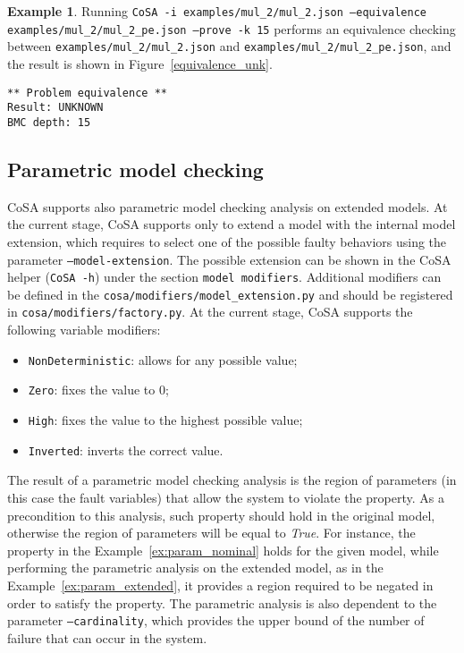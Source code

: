 \documentclass{article}
\theoremstyle{definition}
\newtheorem{example}{Example}[section]
\begin{document}
\begin{example}
  Running \texttt{CoSA -i examples/mul\_2/mul\_2.json --equivalence
    examples/mul\_2/mul\_2\_pe.json --prove -k 15} performs an
  equivalence checking between \texttt{examples/mul\_2/mul\_2.json}
  and \texttt{examples/mul\_2/mul\_2\_pe.json}, and the result is
  shown in Figure~\ref{equivalence_unk}.

\begin{lstlisting}[frame=single,language=ets,caption=Equivalence example (UNKNOWN),label=equivalence_unk]
** Problem equivalence **
Result: UNKNOWN
BMC depth: 15
\end{lstlisting}

\end{example}

\subsection{Parametric model checking}

CoSA supports also parametric model checking analysis on extended
models. At the current stage, CoSA supports only to extend a model
with the internal model extension, which requires to select one of the
possible faulty behaviors using the parameter
\texttt{--model-extension}. The possible extension can be shown in the
CoSA helper (\texttt{CoSA -h}) under the section \texttt{model
  modifiers}. Additional modifiers can be defined in the
\texttt{cosa/modifiers/model\_extension.py} and should be registered
in \texttt{cosa/modifiers/factory.py}. At the current stage, CoSA
supports the following variable modifiers:

\begin{itemize}
\item \texttt{NonDeterministic}: allows for any possible value;
\item \texttt{Zero}: fixes the value to 0;
\item \texttt{High}: fixes the value to the highest possible value;
\item \texttt{Inverted}: inverts the correct value.
\end{itemize}

The result of a parametric model checking analysis is the region of
parameters (in this case the fault variables) that allow the system to
violate the property. As a precondition to this analysis, such
property should hold in the original model, otherwise the region of
parameters will be equal to \emph{True}. For instance, the property in
the Example~\ref{ex:param_nominal} holds for the given model, while
performing the parametric analysis on the extended model, as in the
Example~\ref{ex:param_extended}, it provides a region required to be
negated in order to satisfy the property. The parametric analysis is
also dependent to the parameter \texttt{--cardinality}, which provides
the upper bound of the number of failure that can occur in the system.
\end{document}
